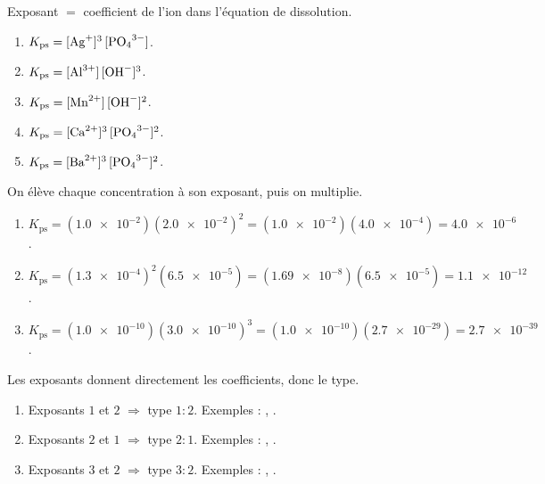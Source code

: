 \documentclass[11pt,a4paper]{article}
\begin{document}
\begin{corrige}
Exposant $=$ coefficient de l'ion dans l'équation de dissolution.
\begin{enumerate}[label=\alph*)]
  \item $K_{\mathrm{ps}} = [\ce{Ag+}]^{3}\,[\ce{PO4^{3-}}]$.
  \item $K_{\mathrm{ps}} = [\ce{Al^{3+}}]\,[\ce{OH-}]^{3}$.
  \item $K_{\mathrm{ps}} = [\ce{Mn^{2+}}]\,[\ce{OH-}]^{2}$.
  \item $K_{\mathrm{ps}} = [\ce{Ca^{2+}}]^{3}\,[\ce{PO4^{3-}}]^{2}$.
  \item $K_{\mathrm{ps}} = [\ce{Ba^{2+}}]^{3}\,[\ce{PO4^{3-}}]^{2}$.
\end{enumerate}
\end{corrige}

\begin{corrige}
On élève chaque concentration à son exposant, puis on multiplie.
\begin{enumerate}[label=\alph*)]
  \item $K_{\mathrm{ps}} = (\num{1.0e-2})(\num{2.0e-2})^{2} = (\num{1.0e-2})(\num{4.0e-4}) = \num{4.0e-6}$.
  \item $K_{\mathrm{ps}} = (\num{1.3e-4})^{2}(\num{6.5e-5}) = (\num{1.69e-8})(\num{6.5e-5}) = \num{1.1e-12}$.
  \item $K_{\mathrm{ps}} = (\num{1.0e-10})(\num{3.0e-10})^{3} = (\num{1.0e-10})(\num{2.7e-29}) = \num{2.7e-39}$.
\end{enumerate}
\end{corrige}

\begin{corrige}
Les exposants donnent directement les coefficients, donc le type.
\begin{enumerate}[label=\alph*)]
  \item Exposants $1$ et $2$ $\Rightarrow$ type $1{:}2$. Exemples : , .
  \item Exposants $2$ et $1$ $\Rightarrow$ type $2{:}1$. Exemples : , .
  \item Exposants $3$ et $2$ $\Rightarrow$ type $3{:}2$. Exemples : , .
\end{enumerate}
\end{corrige}
\end{document}
